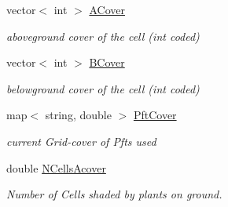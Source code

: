 \begin{DoxyCompactItemize}
\mbox{\label{class_c_envir_a22976cfa98129cb169e8ebe2f9d6459b}} 
vector$<$ int $>$ \mbox{\hyperlink{class_c_envir_a22976cfa98129cb169e8ebe2f9d6459b}{A\+Cover}}
\begin{DoxyCompactList}\small\item\em aboveground cover of the cell (int coded) \end{DoxyCompactList}\item 
\mbox{\label{class_c_envir_a2f00dd63c360e8b5b3ad2f044a69f8a5}} 
vector$<$ int $>$ \mbox{\hyperlink{class_c_envir_a2f00dd63c360e8b5b3ad2f044a69f8a5}{B\+Cover}}
\begin{DoxyCompactList}\small\item\em belowground cover of the cell (int coded) \end{DoxyCompactList}\item 
\mbox{\label{class_c_envir_af48975b9f3e0baebf84b045e5af5027c}} 
map$<$ string, double $>$ \mbox{\hyperlink{class_c_envir_af48975b9f3e0baebf84b045e5af5027c}{Pft\+Cover}}
\begin{DoxyCompactList}\small\item\em current Grid-\/cover of Pfts used \end{DoxyCompactList}\item 
\mbox{\label{class_c_envir_a41042c073c600ed8e77c68b7382a8b34}} 
double \mbox{\hyperlink{class_c_envir_a41042c073c600ed8e77c68b7382a8b34}{N\+Cells\+Acover}}
\begin{DoxyCompactList}\small\item\em Number of Cells shaded by plants on ground. \end{DoxyCompactList}\end{DoxyCompactItemize}
